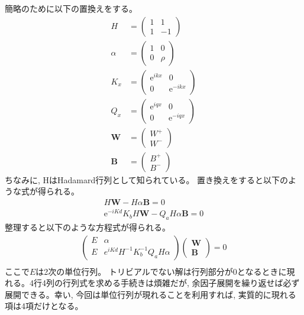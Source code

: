\documentclass[a4paper, lualatex]{bxjsarticle}
\begin{document}
    簡略のために以下の置換えをする。
    \begin{align}
     H&=\begin{pmatrix} 1 & 1 \\ 1 & -1 \end{pmatrix}\nonumber\\
        \alpha &=\begin{pmatrix} 1 & 0 \\ 0 & \rho  \end{pmatrix}\nonumber\\
        K_x&=\begin{pmatrix} \mathrm{e}^{ikx} & 0 \\ 0 &  \mathrm{e}^{-ikx} \end{pmatrix}\nonumber\\
        Q_x&=\begin{pmatrix} \mathrm{e}^{iqx} & 0 \\ 0 &  \mathrm{e}^{-iqx} \end{pmatrix}\nonumber\\
        \mathbf{W}& = \begin{pmatrix} W^{+} \\ W^{-} \end{pmatrix}\nonumber\\
        \mathbf{B}& = \begin{pmatrix} B^{+} \\ B^{-} \end{pmatrix}
    \end{align}
    ちなみに, HはHadamard行列として知られている。
    置き換えをすると以下のような式が得られる。
    \begin{align}
     H \mathbf{W} - H \alpha \mathbf{B} = 0\nonumber\\
        \mathrm{e}^{-iKd} K_b H \mathbf{W} - Q_a H \alpha \mathbf{B} = 0
    \end{align}
    整理すると以下のような方程式が得られる。
    \begin{align}
     \begin{pmatrix} E & \alpha  \\ E & { e }^{ iKd }H^{ -1 }K_{ b }^{ -1 } Q_{ a }H\alpha  \end{pmatrix}\begin{pmatrix} \mathbf{ W } \\ \mathbf{ B } \end{pmatrix}=0\nonumber\\
    \end{align}
    ここで$E$は2次の単位行列。
    トリビアルでない解は行列部分が0となるときに現れる。4行4列の行列式を求める手続きは煩雑だが, 余因子展開を繰り返せば必ず展開できる。幸い, 今回は単位行列が現れることを利用すれば, 実質的に現れる項は4項だけとなる。
\end{document}
